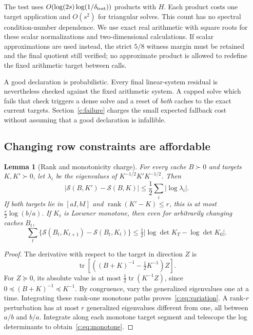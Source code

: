 \documentclass[11pt]{amsart}
\newtheorem{lemma}[theorem]{Lemma}
\theoremstyle{definition}\newtheorem{definition}[theorem]{Definition}
\theoremstyle{remark}\newtheorem{remark}[theorem]{Remark}
\numberwithin{equation}{section}
\newcommand{\tr}{\operatorname{tr}}
\newcommand{\rank}{\operatorname{rank}}
\begin{document}
The test uses $O(\log(2s)\log(1/\delta_{\rm test}))$ products with $H$.
Each product costs one target application and $O(s^2)$ for triangular
solves. This count has no spectral condition-number dependence. We use
exact real arithmetic with square roots for these scalar normalizations
and two-dimensional calculations. If scalar approximations are used
instead, the strict $5/8$ witness margin must be retained and the final
quotient still verified; no approximate product is allowed to redefine the
fixed arithmetic target between calls.

A good declaration is probabilistic. Every final linear-system residual
is nevertheless checked against the fixed arithmetic system. A capped
solve which fails that check triggers a dense solve and a reset of
\emph{both} caches to the exact current targets. Section~\ref{c:failure}
charges the small expected fallback cost without assuming that a good
declaration is infallible.

\subsection{Changing row constraints are affordable}
\begin{lemma}[Rank and monotonicity charge]\label{c:lem:drift}
For every cache $B\succ0$ and targets $K,K'\succ0$, let
$\lambda_i$ be the eigenvalues of $K^{-1/2}K'K^{-1/2}$. Then
\begin{equation}\label{c:eq:variation}
 |\mathcal{S}(B,K')-\mathcal{S}(B,K)|
 \le\frac12\sum_i|\log\lambda_i|.
\end{equation}
If both targets lie in $[aI,bI]$ and $\rank(K'-K)\le r$, this is at most
$\tfrac r2\log(b/a)$. If $K_t$ is Loewner monotone, then even for
arbitrarily changing caches $B_t$,
\begin{equation}\label{c:eq:monotone}
 \sum_t\{\mathcal{S}(B_t,K_{t+1})-\mathcal{S}(B_t,K_t)\}
 \le\tfrac12|\log\det K_T-\log\det K_0|.
\end{equation}
\end{lemma}
\begin{proof}
The derivative with respect to the target in direction $Z$ is
\[
 \tr\left[\left((B+K)^{-1}-\tfrac12K^{-1}\right)Z\right].
\]
For $Z\succeq0$, its absolute value is at most
$\tfrac12\tr(K^{-1}Z)$, since $0\preceq(B+K)^{-1}\preceq K^{-1}$.
By congruence, vary the generalized eigenvalues one at a time. Integrating
these rank-one monotone paths proves~\eqref{c:eq:variation}. A rank-$r$
perturbation has at most $r$ generalized eigenvalues different from one,
all between $a/b$ and $b/a$. Integrate along each monotone target segment
and telescope the log determinants to obtain~\eqref{c:eq:monotone}.
\end{proof}
\end{document}
